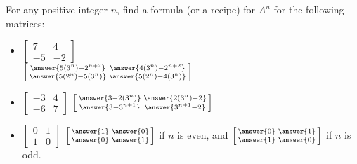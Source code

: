 \documentclass{ximera}
\begin{document}
\begin{exercise}%
    For any positive integer $n$, find a formula (or a recipe) for $A^n$ for the following matrices:
    \begin{itemize}
        \item
        $\begin{bmatrix}
            7 & 4 \\ 
            -5 & -2
        \end{bmatrix}$\\
        $\left[\begin{smallmatrix}
            \answer{5 (3^n)-2^{n+2}} & \answer{4 (3^n)-2^{n+2}}\\
            \answer{5 (2^n)-5 (3^n)} & \answer{5 (2^n)-4 (3^n)}
        \end{smallmatrix}\right]$
        \item
        $\begin{bmatrix}
            -3 & 4 \\ 
            -6 & 7
        \end{bmatrix}$
        $\left[\begin{smallmatrix}
            \answer{3-2 (3^n)} & \answer{2 (3^n)-2}\\
            \answer{3-3^{n+1}} & \answer{3^{n+1}-2}
        \end{smallmatrix}\right]$
        \item
        $\begin{bmatrix}
            0 & 1 \\ 
            1 & 0
        \end{bmatrix}$
        $\left[\begin{smallmatrix} \answer{1} & \answer{0} \\ \answer{0} & \answer{1} \end{smallmatrix}\right]$
        if $n$ is even, and
        $\left[\begin{smallmatrix} \answer{0} & \answer{1} \\ \answer{1} & \answer{0} \end{smallmatrix}\right]$
        if $n$ is odd.
    \end{itemize}
\end{exercise}
\end{document}
